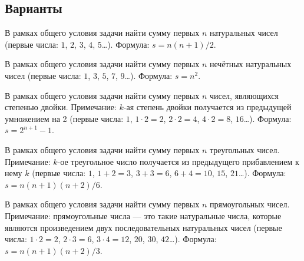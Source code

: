 \subsection*{Варианты}


\begin{zztask}
В рамках общего условия задачи найти сумму первых $n$ натуральных чисел
(первые числа: $1$, $2$, $3$, $4$, $5$\dots).
Формула: $s = n(n+1)/2$.
\end{zztask}


\begin{zztask}
В рамках общего условия задачи найти сумму первых $n$ нечётных натуральных 
чисел (первые числа: $1$, $3$, $5$, $7$, $9$\dots).
Формула: $s = n^2$.
\end{zztask}


\begin{zztask}
В рамках общего условия задачи найти сумму первых $n$ чисел, являющихся
степенью двойки. Примечание: $k$-ая степень двойки получается из предыдущей
умножением на 2 (первые числа: $1$, $1\cdot2=2$, $2\cdot2=4$, $4\cdot2=8$, 
$16$\dots).
Формула: $s = 2^{n+1}-1$.
\end{zztask}


\begin{zztask}
В рамках общего условия задачи найти сумму первых $n$ треугольных чисел.
Примечание: $k$-ое треугольное число получается из предыдущего прибавлением
к нему $k$ (первые числа: $1$, $1+2=3$, $3+3=6$, $6+4=10$, $15$, $21$\dots).
Формула: $s = n(n+1)(n+2)/6$.
\end{zztask}


\begin{zztask}
В рамках общего условия задачи найти сумму первых $n$ прямоугольных чисел.
Примечание: прямоугольные числа --- это такие натуральные числа, которые
являются произведением двух последовательных натуральных чисел
(первые числа: $1\cdot2=2$, $2\cdot3=6$, $3\cdot4=12$, $20$, $30$, $42$\dots).
Формула: $s = n(n+1)(n+2)/3$.
\end{zztask}


